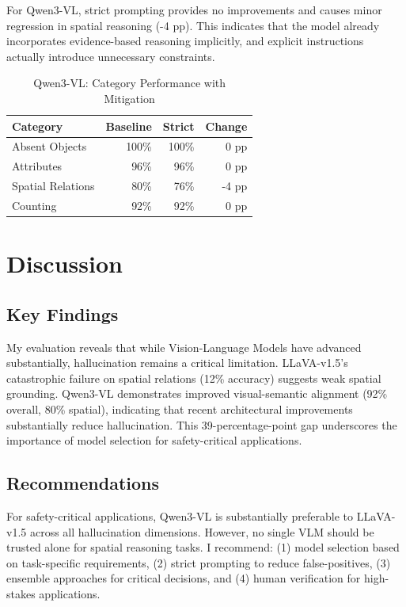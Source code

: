 \documentclass[11pt,a4paper]{article}
\begin{document}
For Qwen3-VL, strict prompting provides no improvements and causes minor regression in spatial reasoning (-4 pp). This indicates that the model already incorporates evidence-based reasoning implicitly, and explicit instructions actually introduce unnecessary constraints.

\vspace{10pt}
\begin{table}[H]
\centering
\begin{tabular}{lrrr}
\toprule
\textbf{Category} & \textbf{Baseline} & \textbf{Strict} & \textbf{Change} \\
\midrule
Absent Objects & 100\% & 100\% & 0 pp \\
Attributes & 96\% & 96\% & 0 pp \\
Spatial Relations & 80\% & 76\% & -4 pp \\
Counting & 92\% & 92\% & 0 pp \\
\bottomrule
\end{tabular}
\caption{Qwen3-VL: Category Performance with Mitigation}
\end{table}

\section{Discussion}

\subsection{Key Findings}

My evaluation reveals that while Vision-Language Models have advanced substantially, hallucination remains a critical limitation. LLaVA-v1.5's catastrophic failure on spatial relations (12\% accuracy) suggests weak spatial grounding. Qwen3-VL demonstrates improved visual-semantic alignment (92\% overall, 80\% spatial), indicating that recent architectural improvements substantially reduce hallucination. This 39-percentage-point gap underscores the importance of model selection for safety-critical applications.

\subsection{Recommendations}

For safety-critical applications, Qwen3-VL is substantially preferable to LLaVA-v1.5 across all hallucination dimensions. However, no single VLM should be trusted alone for spatial reasoning tasks. I recommend: (1) model selection based on task-specific requirements, (2) strict prompting to reduce false-positives, (3) ensemble approaches for critical decisions, and (4) human verification for high-stakes applications.
\end{document}
